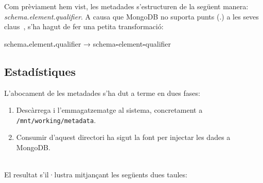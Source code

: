 \noindent
Com prèviament hem vist, les metadades s’estructuren de la següent manera: \textit{schema.element.qualifier}.
A causa que MongoDB no suporta punts (.) a les seves claus~\cite{mongodb:key-restrictions}, s’ha hagut de fer una petita transformació:

\begin{center}
  schema\textbf{.}element\textbf{.}qualifier → schema\textbf{-}element\textbf{-}qualifier
\end{center}

\clearpage

\subsection{Estadístiques}\label{subsec:metadata-statistics}

L'abocament de les metadades s'ha dut a terme en dues fases:

\begin{enumerate}
  \item Descàrrega i l'emmagatzematge al sistema, concretament a \\ \texttt{/mnt/working/metadata}.
  \item Consumir d'aquest directori ha sigut la font per injectar les dades a \\ MongoDB.
\end{enumerate}

\noindent \\
El resultat s'il·lustra mitjançant les següents dues taules: \\

